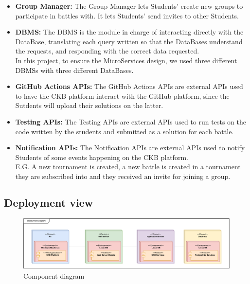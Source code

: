 \documentclass{article}
\begin{document}
{\begin{itemize}
The Evaluation Manager also lets Educators manually evaluate each Student's solution, and upload the grade to the platform via the Tournament DBMS.\\
\item \textbf{Group Manager:} The Group Manager lets Students' create new groups to participate in battles with. It lets Students' send invites to other Students.\\
\item \textbf{DBMS:} The DBMS is the module in charge of interacting directly with the DataBase, translating each query written so that
the DataBases understand the requests, and responding with the correct data requested.\\
In this project, to ensure the MicroServices design, we used three different DBMSs with three different DataBases.\\
\item \textbf{GitHub Actions APIs:} The GitHub Actions APIs are external APIs used to have the CKB platform interact with the GitHub platform, since the Sutdents will
upload their solutions on the latter. \\
\item \textbf{Testing APIs:} The Testing APIs are external APIs used to run tests on the code written by the students and submitted as a solution for each battle.\\
\item \textbf{Notification APIs:} The Notification APIs are external APIs used to notify Students of some events happening on the CKB platform.\\
E.G. A new tournament is created, a new battle is created in a tournament they are subscribed into and they received an invite for joining a group. \\
\end{itemize}
\subsection{Deployment view}
\begin{figure}[H]
    \centering
    \hspace*{-2.6cm}\includegraphics[scale=0.53]{images/DeploymentDiagram.pdf}
    \caption{Component diagram}
    \label{fig:deploymentDiagram}
\end{figure}

}
\end{document}
